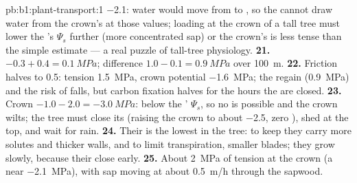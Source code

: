 \begin{solution}{pb:b1:plant-transport:1}
\qty{-2.1}{}: water would move from  to , so the 
cannot draw water from the crown's  at those values; loading at
the crown of a tall tree must lower the 's $\Psi_s$ further
(more concentrated sap) or the crown's  is less tense than the
simple estimate --- a real puzzle of tall-tree physiology.
\textbf{21.} $-0.3 + 0.4 = \qty{0.1}{MPa}$; difference $1.0 - 0.1 =
\qty{0.9}{MPa}$ over \qty{100}{m}.
\textbf{22.} Friction halves to \qty{0.5}{}: tension \qty{1.5}{MPa},
crown potential \qty{-1.6}{MPa}; the  regain 
(\qty{0.9}{MPa}) and the risk of  falls, but carbon fixation
halves for the hours the  are closed.
\textbf{23.} Crown $-1.0 - 2.0 = \qty{-3.0}{MPa}$: below the '
$\Psi_s$, so no  is possible and the crown wilts; the tree must
close its  (raising the crown to about \qty{-2.5}{}, zero
), shed  at the top, and wait for rain.
\textbf{24.} Their  is the lowest in the tree: to keep
 they carry more solutes and thicker walls, and to limit
transpiration, smaller blades; they grow slowly, because their 
close early.
\textbf{25.} About \qty{2}{MPa} of tension at the crown (a  near \qty{-2.1}{MPa}), with sap moving at about \qty{0.5}{m/h}
through the sapwood.
\end{solution}
